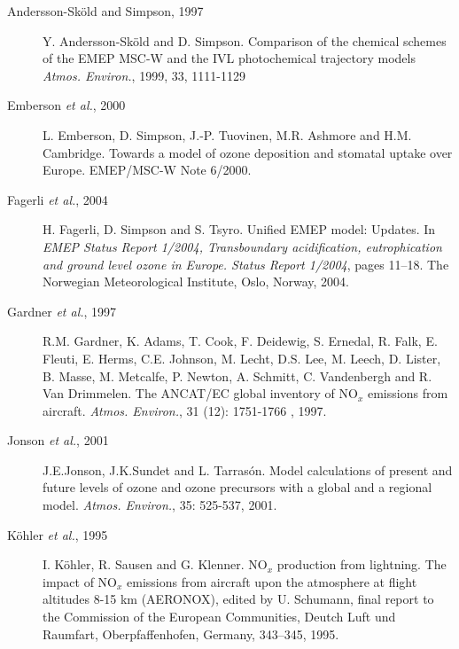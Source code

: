 \documentclass[a4paper,12pt]{report}
\begin{document}
\begin{description}

\item[Andersson-Sk{\"o}ld and Simpson, 1997] Y. Andersson-Sk\"{o}ld
  and D. Simpson. 
Comparison of the chemical schemes of 
the EMEP MSC-W and the IVL photochemical trajectory models {\it Atmos. 
Environ.}, 1999, 33, 1111-1129

\item[Emberson {\sl et al.}, 2000] L. Emberson, D. Simpson,
  J.-P. Tuovinen, M.R. Ashmore and H.M. Cambridge. Towards a model of
  ozone deposition and stomatal uptake over Europe. EMEP/MSC-W
  Note 6/2000.

\item[Fagerli {\sl et al.}, 2004] H. Fagerli, D. Simpson and
  S. Tsyro.
 Unified EMEP model: Updates. In {\it EMEP Status Report
    1/2004, Transboundary acidification, eutrophication and ground
    level ozone in Europe. Status Report 1/2004}, pages 11--18. The Norwegian
Meteorological Institute, Oslo, Norway, 2004.

\item[Gardner {\sl et al.}, 1997] R.M. Gardner, K. Adams, T. Cook,
  F. Deidewig, S. Ernedal, R. Falk, E. Fleuti, E. Herms, C.E. Johnson,
  M. Lecht, D.S. Lee, M. Leech, D. Lister, B. Masse, M. Metcalfe,
  P. Newton, A. Schmitt, C. Vandenbergh and R. Van Drimmelen. The
  ANCAT/EC global inventory of NO$_x$ emissions from 
		  aircraft. {\it Atmos. Environ.}, 31 (12): 1751-1766
, 1997.


\item[Jonson {\sl et al.}, 2001] J.E.Jonson, J.K.Sundet and
  L. Tarras{\'o}n. Model calculations of present and future levels of
ozone and ozone precursors with a global and a regional model. {\it
  Atmos. Environ.}, 35: 525-537, 2001.  


\item[K{\"o}hler {\sl et al.}, 1995] I. K{\"o}hler, R. Sausen and
  G. Klenner. 
NO$_x$ production from lightning. The impact of NO$_x$ emissions from
aircraft upon the atmosphere at flight altitudes 8-15 km (AERONOX),
edited by U. Schumann, final report to the Commission of the European
Communities, Deutch Luft und Raumfart, Oberpfaffenhofen, Germany,
343--345, 1995.



\end{description}
\end{document}
